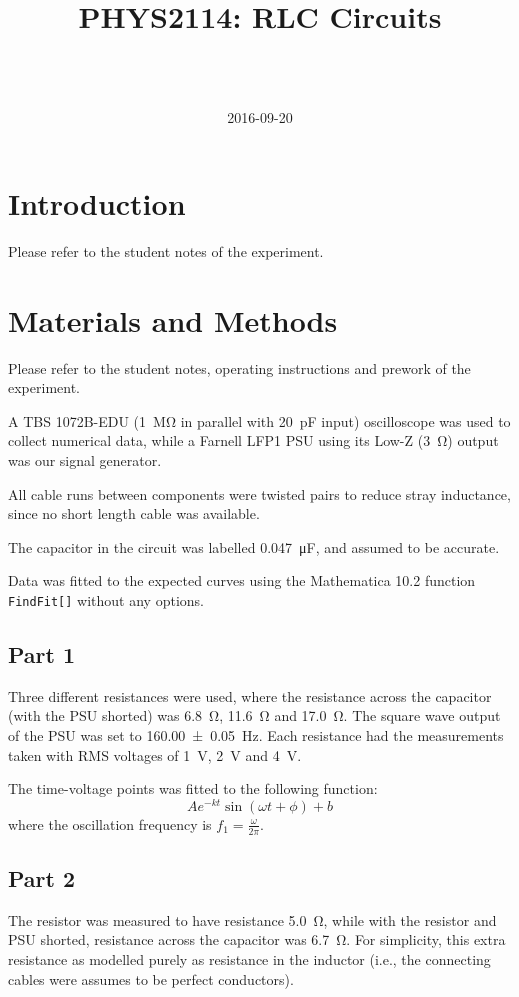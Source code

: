 \documentclass[a4paper]{scrartcl}
\begin{document}
\title{PHYS2114: RLC Circuits}
\author{ \\ \\ }
\date{2016-09-20}
\maketitle

\section{Introduction}
Please refer to the student notes of the experiment.

\section{Materials and Methods}
Please refer to the student notes, operating instructions and prework of the experiment.

A TBS 1072B-EDU (\SI{1}{\mega\ohm} in parallel with \SI{20}{\pico\farad} input) oscilloscope was used to collect numerical data, while a Farnell LFP1 PSU using its Low-Z (\SI{3}{\ohm}) output was our signal generator.

All cable runs between components were twisted pairs to reduce stray inductance, since no short length cable was available.

The capacitor in the circuit was labelled \SI{0.047}{\micro\farad}, and assumed to be accurate.

Data was fitted to the expected curves using the Mathematica 10.2 function \texttt{FindFit[]} without any options.

\subsection{Part 1}
Three different resistances were used, where the resistance across the capacitor (with the PSU shorted) was \SI{6.8}{\ohm}, \SI{11.6}{\ohm} and \SI{17.0}{\ohm}. The square wave output of the PSU was set to \SI{160.00 \pm 0.05}{\hertz}. Each resistance had the measurements taken with RMS voltages of \SI{1}{\volt}, \SI{2}{\volt} and \SI{4}{\volt}.

The time-voltage points was fitted to the following function:
\[A e^{-k t} \sin(\omega t + \phi) + b\]
where the oscillation frequency is \(f_1 = \frac{\omega}{2 \pi}\).

\subsection{Part 2}
The resistor was measured to have resistance \SI{5.0}{\ohm}, while with the resistor and PSU shorted, resistance across the capacitor was \SI{6.7}{\ohm}. For simplicity, this extra resistance as modelled purely as resistance in the inductor (i.e., the connecting cables were assumes to be perfect conductors).
\end{document}
